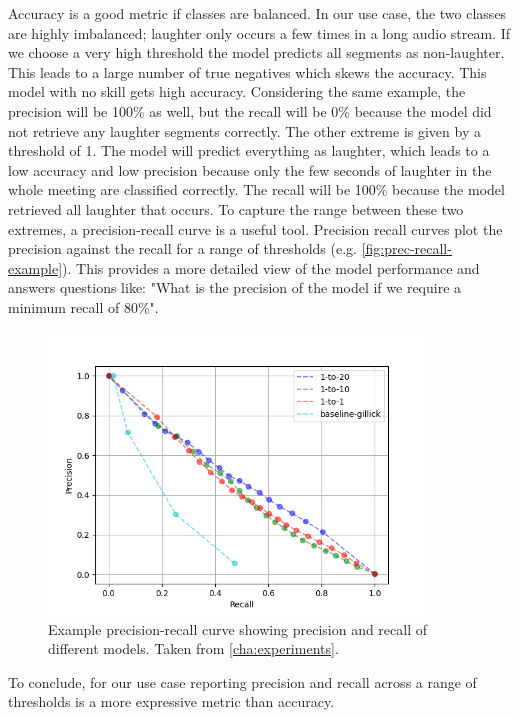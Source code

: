 \documentclass[bsc,frontabs,parskip,deptreport]{infthesis}
\begin{document}
Accuracy is a good metric if classes are balanced. In our use case, the two classes are highly imbalanced; laughter only occurs a few times in a long audio stream. If we choose a very high threshold the model predicts all segments as non-laughter. This leads to a large number of true negatives which skews the accuracy. This model with no skill gets high accuracy.
Considering the same example, the precision will be 100\% as well, but the recall will be 0\% because the model did not retrieve any laughter segments correctly. 
The other extreme is given by a threshold of 1. The model will predict everything as laughter, which leads to a low accuracy and low precision because only the few seconds of laughter in the whole meeting are classified correctly. The recall will be 100\% because the model retrieved all laughter that occurs. 
To capture the range between these two extremes, a precision-recall curve is a useful tool. Precision recall curves plot the precision against the recall for a range of thresholds (e.g. \autoref{fig:prec-recall-example}). This provides a more detailed view of the model performance and answers questions like: "What is the precision of the model if we require a minimum recall of 80\%".

\begin{figure}[h!]
    \centering
    \includegraphics[width = 10cm]{imgs/prec-recall/exp1-random/dev_compare_class_balance_dev_set.png}
    \caption{Example precision-recall curve showing precision and recall of different models. Taken from \autoref{cha:experiments}.}
    \label{fig:prec-recall-example}
\end{figure}

To conclude, for our use case reporting precision and recall across a range of thresholds is a more expressive metric than accuracy.
\end{document}
